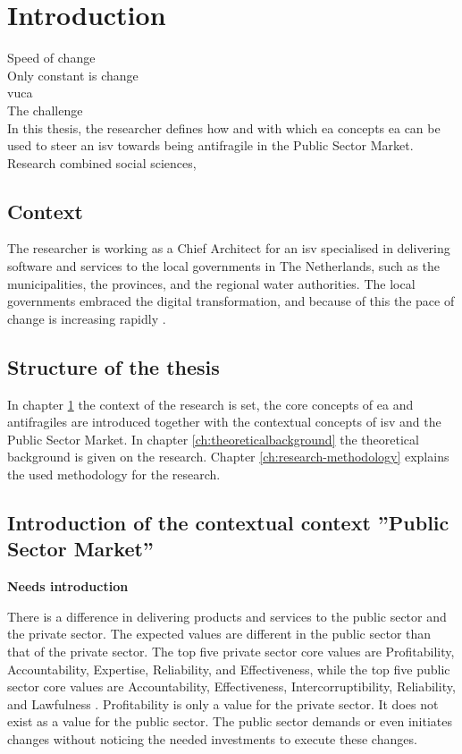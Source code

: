 \chapter{Introduction}
\label{ch:introduction}
Speed of change\\
Only constant is change\\

\acrfull{vuca}\\
The challenge\\

In this thesis, the researcher defines how and with which \acrfull{ea} concepts \acrshort{ea} can be used to steer an \acrfull{isv} towards being \gls{antifragile} in the Public Sector Market.\\

Research combined social sciences, 



\section{Context}
\label{sec:context}
The researcher is working as a Chief Architect for an \acrshort{isv} specialised in delivering software and services to the local governments in The Netherlands, such as the municipalities, the provinces, and the regional water authorities. The local governments embraced the digital transformation, and because of this the pace of change is increasing rapidly \needsref. 

\section{Structure of the thesis}
\label{sec:structure}
In chapter \ref{ch:introduction} the context of the research is set, the core concepts of \acrshort{ea} and \glspl{antifragile} are introduced together with the contextual concepts of \acrshort{isv} and the Public Sector Market. In chapter \ref{ch:theoreticalbackground} the theoretical background is given on the research. Chapter \ref{ch:research-methodology} explains the used methodology for the research.

\section{Introduction of the contextual context ''Public Sector Market''}
\label{sec:intropublicsector}
\textbf{Needs introduction}\par
There is a difference in delivering products and services to the public sector and the private sector. The expected values are different in the public sector than that of the private sector. The top five private sector core values are  Profitability, Accountability, Expertise, Reliability, and Effectiveness, while the top five public sector core values are Accountability, Effectiveness, Intercorruptibility, Reliability, and Lawfulness \parencite{Wal2008}. Profitability is only a value for the private sector. It does not exist as a value for the public sector.  The public sector demands or even initiates changes without noticing the needed investments to execute these changes.

